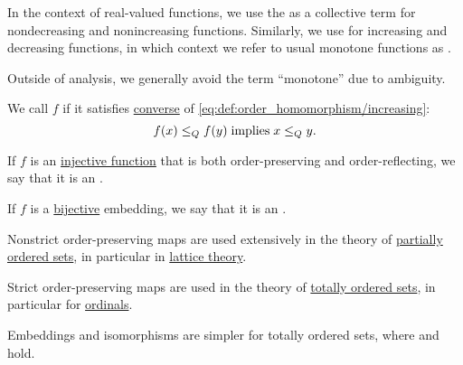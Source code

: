 \begin{definition}
\begin{thmenum}
     In the context of real-valued functions, we use the   as a collective term for nondecreasing and nonincreasing functions. Similarly, we use  for increasing and decreasing functions, in which context we refer to usual monotone functions as .

    Outside of analysis, we generally avoid the term \enquote{monotone} due to ambiguity.

     We call \( f \)  if it satisfies \hyperref[def:material_implication/converse]{converse} of \eqref{eq:def:order_homomorphism/increasing}:
    \begin{equation}\label{eq:def:order_homomorphism/reflecting}
      f(x) \leq_Q f(y) \T{implies} x \leq_Q y.
    \end{equation}

     If \( f \) is an \hyperref[def:function_invertibility/injective]{injective function} that is both order-preserving and order-reflecting, we say that it is an .

     If \( f \) is a \hyperref[def:function_invertibility/bijective]{bijective} embedding, we say that it is an .
  \end{thmenum}
\end{definition}
\begin{comments}
  \item Nonstrict order-preserving maps are used extensively in the theory of \hyperref[subsec:partially_ordered_sets]{partially ordered sets}, in particular in \hyperref[subsec:lattices]{lattice theory}.

  \item Strict order-preserving maps are used in the theory of \hyperref[subsec:partially_ordered_sets]{totally ordered sets}, in particular for \hyperref[subsec:ordinals]{ordinals}.

  \item Embeddings and isomorphisms are simpler for totally ordered sets, where  and  hold.
\end{comments}

